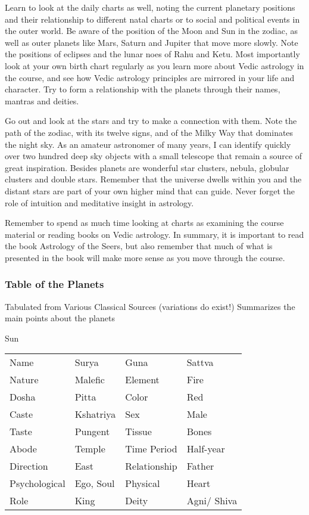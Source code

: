  

Learn to look at the daily charts as well, noting the current planetary positions and their relationship to different natal charts or to social and political events in the outer world.  Be aware of the position of the Moon and Sun in the zodiac, as well as outer planets like Mars, Saturn and Jupiter that move more slowly. Note the positions of eclipses and the lunar noes of Rahu and Ketu. Most importantly look at your own birth chart regularly as you learn more about Vedic astrology in the course, and see how Vedic astrology principles are mirrored in your life and character. Try to form a relationship with the planets through their names, mantras and deities.

 

Go out and look at the stars and try to make a connection with them. Note the path of the zodiac, with its twelve signs, and of the Milky Way that dominates the night sky. As an amateur astronomer of many years, I can identify quickly over two hundred deep sky objects with a small telescope that remain a source of great inspiration. Besides planets are wonderful star clusters, nebula, globular clusters and double stars. Remember that the universe dwells within you and the distant stars are part of your own higher mind that can guide. Never forget the role of intuition and meditative insight in astrology.

 

Remember to spend as much time looking at charts as examining the course material or reading books on Vedic astrology. In summary, it is important to read the book Astrology of the Seers, but also remember that much of what is presented in the book will make more sense as you move through the course.

 

\subsubsection{Table of the Planets}
Tabulated from Various Classical Sources (variations do exist!)
Summarizes the main points about the planets

Sun
\begin{center}
\begin{tabular}{ l l l l}
Name	&Surya	&Guna	&Sattva \\
Nature	&Malefic	&Element	&Fire\\
Dosha	&Pitta	&Color	&Red\\
Caste	&Kshatriya	&Sex	&Male\\
Taste	&Pungent	&Tissue	&Bones\\
Abode	&Temple	&Time Period	&Half-year\\
Direction	&East	&Relationship	&Father\\
Psychological	&Ego, Soul	&Physical	&Heart\\
Role	&King	&Deity	&Agni/ Shiva\\
\end{tabular}
\end{center}

